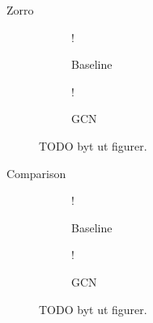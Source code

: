 Zorro

\begin{figure}[H]
    \centering
        \begin{subfigure}{.5\textwidth}
            \centering
            \begin{center}
                 {!} {
                    
                }
            \end{center}
            \caption{Baseline}
            \label{fig:zorro_age_baseline}
        \end{subfigure}%
        \begin{subfigure}{.5\textwidth}
            \centering
            \begin{center}
                 {!} {
                    
                }
            \end{center}
            \caption{GCN}
            \label{fig:zorro_age_gcn}
        \end{subfigure}
    \caption{TODO byt ut figurer.}
    \label{fig:zorro_age}
\end{figure}

Comparison


\begin{figure}[H]
    \centering
        \begin{subfigure}{.5\textwidth}
            \centering
            \begin{center}
                 {!} {
                    
                }
            \end{center}
            \caption{Baseline}
            \label{fig:comparison_age_naive}
        \end{subfigure}%
        \begin{subfigure}{.5\textwidth}
            \centering
            \begin{center}
                 {!} {
                    
                }
            \end{center}
            \caption{GCN}
            \label{fig:comparison_age_zorro}
        \end{subfigure}
    \caption{TODO byt ut figurer.}
    \label{fig:comparison_age}
\end{figure}